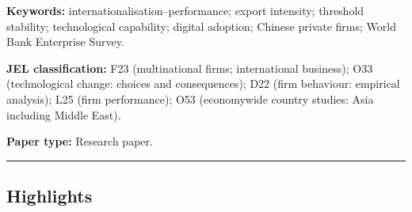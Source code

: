 \documentclass[12pt,a4paper]{article}
\begin{document}
\textbf{Keywords:} internationalisation--performance; export intensity;
threshold stability; technological capability; digital adoption; Chinese
private firms; World Bank Enterprise Survey.

\textbf{JEL classification:} F23 (multinational firms; international
business); O33 (technological change: choices and consequences); D22
(firm behaviour: empirical analysis); L25 (firm performance); O53
(economywide country studies: Asia including Middle East).

\textbf{Paper type:} Research paper.

\begin{center}\rule{0.5\linewidth}{0.5pt}\end{center}

\hypertarget{highlights}{%
\subsection{Highlights}\label{highlights}}
\end{document}
